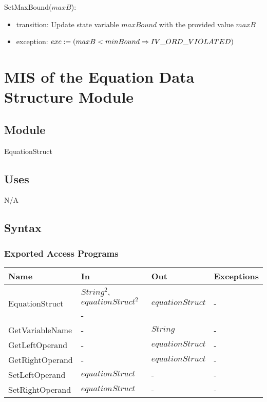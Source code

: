 \documentclass[12pt, titlepage]{article}
\begin{document}
\noindent SetMaxBound($maxB$):
\begin{itemize}
	\item transition: Update state variable $maxBound$ with the provided value 
	$maxB$
	\item exception: $exc := \\
	(maxB < minBound \Rightarrow IV\_ORD\_VIOLATED)$
\end{itemize}

\newpage

\section{MIS of the Equation Data Structure Module} 
\label{Module_equationdatastructure}

\subsection{Module}

EquationStruct

\subsection{Uses}

N/A

\subsection{Syntax}

\subsubsection{Exported Access Programs}

\begin{center}
	\begin{tabular}{p{3cm} p{3cm} p{3cm} p{5cm}}
		\hline
		\textbf{Name} & \textbf{In} & \textbf{Out} & \textbf{Exceptions} \\
		\hline
		\multirow{2}{3cm}{EquationStruct} & $String^2$, $equationStruct^2$ & 
		\multirow{2}{3cm}{$equationStruct$} & 
		\multirow{2}{5cm}{-}\\
		GetOperator & - & $String$ & - \\
		GetVariableName & - & $String$ & - \\
		GetLeftOperand & - & $equationStruct$ & -\\
		GetRightOperand & - & $equationStruct$ & - \\
		SetLeftOperand & $equationStruct$ & - & - \\
		SetRightOperand & $equationStruct$ & - & - \\
		\hline
	\end{tabular}
\end{center}
\end{document}
